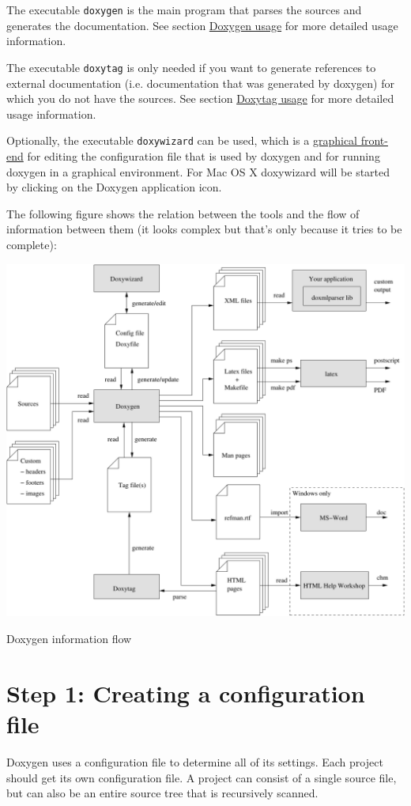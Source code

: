 The executable {\tt doxygen} is the main program that parses the sources and generates the documentation. See section \hyperlink{doxygen_usage}{Doxygen usage} for more detailed usage information.

The executable {\tt doxytag} is only needed if you want to generate references to external documentation (i.e. documentation that was generated by doxygen) for which you do not have the sources. See section \hyperlink{doxytag_usage}{Doxytag usage} for more detailed usage information.

Optionally, the executable {\tt doxywizard} can be used, which is a \hyperlink{doxywizard_usage}{graphical front-end} for editing the configuration file that is used by doxygen and for running doxygen in a graphical environment. For Mac OS X doxywizard will be started by clicking on the Doxygen application icon.

The following figure shows the relation between the tools and the flow of information between them (it looks complex but that's only because it tries to be complete):

 \begin{Image}
\begin{center}
\includegraphics[width=14cm]{infoflow}\caption{Doxygen information flow}
\end{center}
\end{Image}
\hypertarget{starting_step1}{}\section{Step 1: Creating a configuration file}\label{starting_step1}
Doxygen uses a configuration file to determine all of its settings. Each project should get its own configuration file. A project can consist of a single source file, but can also be an entire source tree that is recursively scanned.


